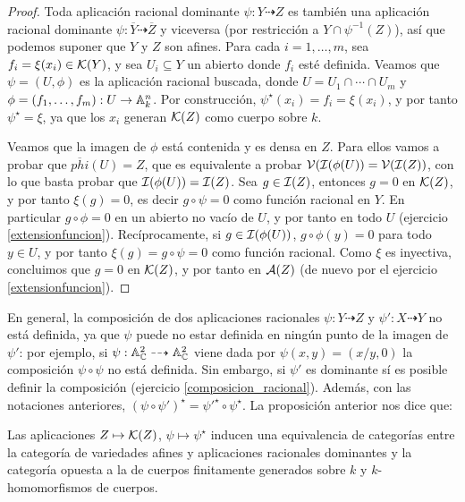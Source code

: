 \documentclass[ACGA.tex]{subfiles}
\begin{document}
\begin{proof}
 Toda aplicación racional dominante $\psi:Y\dashrightarrow Z$ es también una aplicación racional dominante $\psi:\overline Y\dashrightarrow\overline Z$ y viceversa (por restricción a $Y\cap\psi^{-1}(Z)$), así que podemos suponer que $Y$ y $Z$ son afines. Para cada $i=1,\ldots,m$, sea $f_i=\xi(x_i)\in{\mathcal K}(Y)$, y sea $U_i\subseteq Y$ un abierto donde $f_i$ esté definida. Veamos que $\psi=(U,\phi)$ es la aplicación racional buscada, donde $U=U_1\cap\cdots\cap U_m$ y $\phi=(f_1,\ldots,f_m): U\to\mathbb{A}^n_k$. Por construcción, $\psi^\star(x_i)=f_i=\xi(x_i)$, y por tanto $\psi^\star=\xi$, ya que los $x_i$ generan ${\mathcal K}(Z)$ como cuerpo sobre $k$.

 Veamos que la imagen de $\phi$ está contenida y es densa en $Z$. Para ellos vamos a probar que $\overline{phi}(U)=Z$, que es equivalente a probar $\mathcal{V}(\mathcal{I}(\phi(U))=\mathcal{V}(\mathcal{I}(Z))$, con lo que basta probar que $\mathcal{I}(\phi(U))=\mathcal{I}(Z)$. Sea $g\in\mathcal{I}(Z)$, entonces $g=0$ en ${\mathcal K}(Z)$, y por tanto $\xi(g)=0$, es decir $g\circ\psi=0$ como función racional en $Y$. En particular $g\circ\phi=0$ en un abierto no vacío de $U$, y por tanto en todo $U$ (ejercicio \ref{extensionfuncion}). Recíprocamente, si $g\in\mathcal{I}(\phi(U))$, $g\circ\phi(y)=0$ para todo $y\in U$, y por tanto $\xi(g)=g\circ\psi=0$ como función racional. Como $\xi$ es inyectiva, concluimos que $g=0$ en ${\mathcal K}(Z)$, y por tanto en $\mathcal{A}(Z)$ (de nuevo por el ejercicio \ref{extensionfuncion}).
\end{proof}

En general, la composición de dos aplicaciones racionales $\psi:Y\dashrightarrow Z$ y $\psi':X\dashrightarrow Y$ no está definida, ya que $\psi$ puede no estar definida en ningún punto de la imagen de $\psi'$: por ejemplo, si $\psi:\mathbb{A}^2_{\mathbb{C}}\dashrightarrow\mathbb{A}^2_{\mathbb{C}}$ viene dada por $\psi(x,y)=(x/y,0)$ la composición $\psi\circ \psi$  no está definida. Sin embargo, si $\psi'$ es dominante sí es posible definir la composición (ejercicio \ref{composicion_racional}). Además, con las notaciones anteriores, $(\psi\circ\psi')^\star=\psi'^\star\circ\psi^\star$. La proposición anterior nos dice que:

\begin{prop}
  Las aplicaciones $Z\mapsto {\mathcal K}(Z)$, $\psi\mapsto \psi^\star$ inducen una equivalencia de categorías entre la categoría de variedades afines y aplicaciones racionales dominantes y la categoría opuesta a la de cuerpos finitamente generados sobre $k$ y $k$-homomorfismos de cuerpos.
\end{prop}
\end{document}
